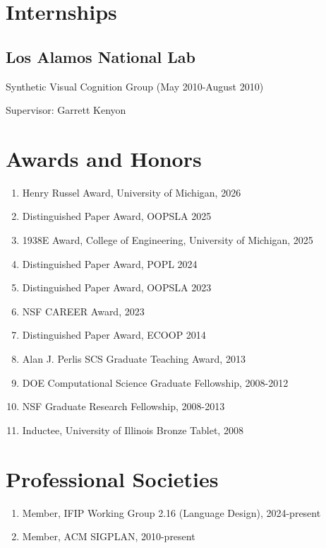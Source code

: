 \documentclass[10pt,letterpaper]{article}
\renewenvironment{itemize}{
  \begin{list}{}{
    \setlength{\leftmargin}{1.25em}
    \setlength{\itemsep}{0.25em}
    \setlength{\parskip}{0pt}
    \setlength{\parsep}{0.2em}
  }
}{
  \end{list}
}
\begin{document}
\section*{Internships}
\subsection*{Los Alamos National Lab}
\begin{itemize}
  \item Synthetic Visual Cognition Group (May 2010-August 2010)
  \item Supervisor: Garrett Kenyon
\end{itemize}

\section*{Awards and Honors}
\begin{enumerate}
  \item Henry Russel Award, University of Michigan, 2026
  \item Distinguished Paper Award, OOPSLA 2025
  \item 1938E Award, College of Engineering, University of Michigan, 2025
  \item Distinguished Paper Award, POPL 2024
  \item Distinguished Paper Award, OOPSLA 2023
  \item NSF CAREER Award, 2023
  \item Distinguished Paper Award, ECOOP 2014
  \item {Alan J. Perlis SCS Graduate Teaching Award, 2013}
  \item DOE Computational Science Graduate Fellowship, 2008-2012
  \item NSF Graduate Research Fellowship, 2008-2013
  \item Inductee, University of Illinois Bronze Tablet, 2008
\end{enumerate}

\section*{Professional Societies}
\begin{enumerate}
  \item Member, IFIP Working Group 2.16 (Language Design), 2024-present
  \item Member, ACM SIGPLAN, 2010-present
\end{enumerate}
\end{document}
